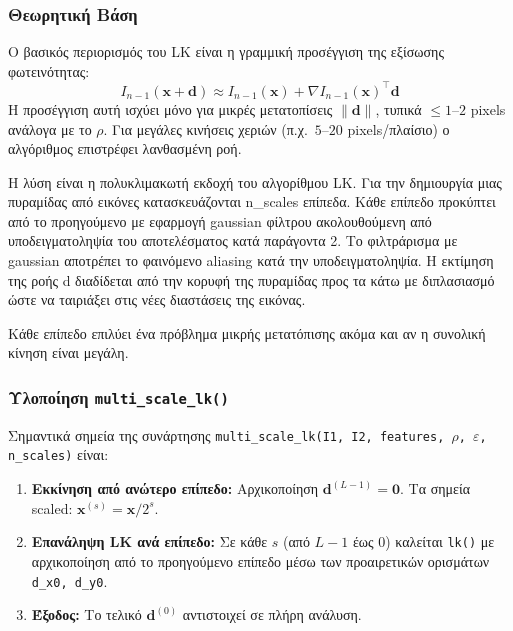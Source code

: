 \documentclass[12pt]{article}
\begin{document}
\subsubsection*{Θεωρητική Βάση}

\hspace{0.6cm}Ο βασικός περιορισμός του LK είναι η γραμμική προσέγγιση της εξίσωσης φωτεινότητας:
\[
    I_{n-1}(\mathbf{x} + \mathbf{d}) \approx I_{n-1}(\mathbf{x}) + \nabla I_{n-1}(\mathbf{x})^\top \mathbf{d}
\]
Η προσέγγιση αυτή ισχύει μόνο για μικρές μετατοπίσεις $\|\mathbf{d}\|$, τυπικά $\leq 1$--$2$ pixels ανάλογα με το $\rho$. Για μεγάλες κινήσεις χεριών (π.χ.\ $5$--$20$ pixels/πλαίσιο) ο αλγόριθμος επιστρέφει λανθασμένη ροή.

Η λύση είναι η πολυκλιμακωτή εκδοχή του αλγορίθμου LK. Για την δημιουργία μιας πυραμίδας από εικόνες κατασκευάζονται n\_scales επίπεδα. Κάθε επίπεδο προκύπτει από το προηγούμενο με εφαρμογή gaussian φίλτρου ακολουθούμενη από υποδειγματοληψία του αποτελέσματος κατά παράγοντα 2. Το φιλτράρισμα με gaussian αποτρέπει το φαινόμενο aliasing κατά την υποδειγματοληψία. Η εκτίμηση της ροής d διαδίδεται από την κορυφή της πυραμίδας προς τα κάτω με διπλασιασμό ώστε να ταιριάξει στις νέες διαστάσεις της εικόνας.

Κάθε επίπεδο επιλύει ένα πρόβλημα μικρής μετατόπισης ακόμα και αν η συνολική κίνηση είναι μεγάλη.

\subsubsection*{Υλοποίηση \texttt{multi\_scale\_lk()}}

\hspace{0.6cm}Σημαντικά σημεία της συνάρτησης \texttt{multi\_scale\_lk(I1, I2, features, $\rho$, $\varepsilon$, n\_scales)} είναι:

\begin{enumerate}

    \item \textbf{Εκκίνηση από ανώτερο επίπεδο:} Αρχικοποίηση $\mathbf{d}^{(L-1)} = \mathbf{0}$. Τα σημεία scaled: $\mathbf{x}^{(s)} = \mathbf{x} / 2^s$.

    \item \textbf{Επανάληψη LK ανά επίπεδο:} Σε κάθε $s$ (από $L{-}1$ έως $0$) καλείται \texttt{lk()} με αρχικοποίηση από το προηγούμενο επίπεδο μέσω των προαιρετικών ορισμάτων \texttt{d\_x0, d\_y0}.

    \item \textbf{Έξοδος:} Το τελικό $\mathbf{d}^{(0)}$ αντιστοιχεί σε πλήρη ανάλυση.
\end{enumerate}
\end{document}
